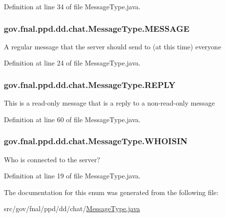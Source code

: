 Definition at line 34 of file Message\-Type.\-java.

\hypertarget{enumgov_1_1fnal_1_1ppd_1_1dd_1_1chat_1_1MessageType_a959fbbd3acc7337c34fefdab32951384}{
\subsubsection[{M\-E\-S\-S\-A\-G\-E}]{\setlength{\rightskip}{0pt plus 5cm}gov.\-fnal.\-ppd.\-dd.\-chat.\-Message\-Type.\-M\-E\-S\-S\-A\-G\-E}}\label{enumgov_1_1fnal_1_1ppd_1_1dd_1_1chat_1_1MessageType_a959fbbd3acc7337c34fefdab32951384}
A regular message that the server should send to (at this time) everyone 

Definition at line 24 of file Message\-Type.\-java.

\hypertarget{enumgov_1_1fnal_1_1ppd_1_1dd_1_1chat_1_1MessageType_a6ef4f1adf848fa896983c37f6f4c213d}{
\subsubsection[{R\-E\-P\-L\-Y}]{\setlength{\rightskip}{0pt plus 5cm}gov.\-fnal.\-ppd.\-dd.\-chat.\-Message\-Type.\-R\-E\-P\-L\-Y}}\label{enumgov_1_1fnal_1_1ppd_1_1dd_1_1chat_1_1MessageType_a6ef4f1adf848fa896983c37f6f4c213d}
This is a read-\/only message that is a reply to a non-\/read-\/only message 

Definition at line 60 of file Message\-Type.\-java.

\hypertarget{enumgov_1_1fnal_1_1ppd_1_1dd_1_1chat_1_1MessageType_aaed6083ff4a292a4ea95ef09c8cc0989}{
\subsubsection[{W\-H\-O\-I\-S\-I\-N}]{\setlength{\rightskip}{0pt plus 5cm}gov.\-fnal.\-ppd.\-dd.\-chat.\-Message\-Type.\-W\-H\-O\-I\-S\-I\-N}}\label{enumgov_1_1fnal_1_1ppd_1_1dd_1_1chat_1_1MessageType_aaed6083ff4a292a4ea95ef09c8cc0989}
Who is connected to the server? 

Definition at line 19 of file Message\-Type.\-java.



The documentation for this enum was generated from the following file\-:\begin{DoxyCompactItemize}
\item 
src/gov/fnal/ppd/dd/chat/\hyperlink{MessageType_8java}{Message\-Type.\-java}\end{DoxyCompactItemize}
